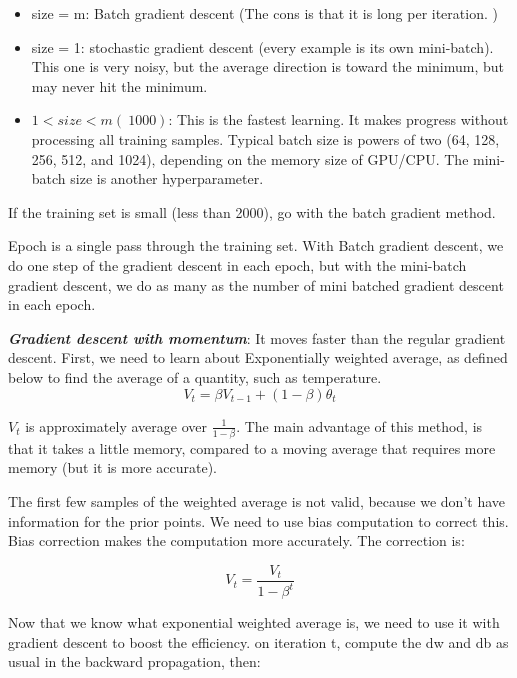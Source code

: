\documentclass[12pt]{report}
\begin{document}
\begin{itemize}
  \item size = m: Batch gradient descent (The cons is that it is long per iteration. )
  \item size = 1: stochastic gradient descent (every example is its own mini-batch). This one is very noisy, but the average direction is toward the minimum, but may never hit the minimum.
  \item $1< size < m (~1000)$: This is the fastest learning. It makes progress without processing all training samples. Typical batch size is powers of two (64, 128, 256, 512, and 1024), depending on the memory size of GPU/CPU. The mini-batch size is another hyperparameter.
\end{itemize}

If the training set is small (less than 2000), go with the batch gradient method.

Epoch is a single pass through the training set. With Batch gradient descent, we do one step of the gradient descent in each epoch, but with the mini-batch gradient descent, we do as many as the number of mini batched gradient descent in each epoch.

\textbf{\textit{Gradient descent with momentum}}: It moves faster than the regular gradient descent. First, we need to learn about Exponentially weighted average, as defined below to find the average of a quantity, such as temperature.
\begin{equation}
  V_t = \beta V_{t-1} + (1-\beta) \theta_t
\end{equation}

$V_t$ is approximately average over $\frac{1}{1-\beta}$. The main advantage of this method, is that it takes a little memory, compared to a moving average that requires more memory (but it is more accurate).

The first few samples of the weighted average is not valid, because we don't have information for the prior points. We need to use bias computation to correct this. Bias correction makes the computation more accurately. The correction is:

\begin{equation}
  V_t = \frac{V_{t}}{1-\beta^t}
\end{equation}


Now that we know what exponential weighted average is, we need to use it with gradient descent to boost the efficiency. on iteration t, compute the dw and db as usual in the backward propagation, then:
\end{document}
